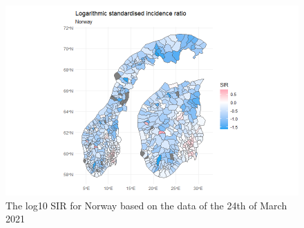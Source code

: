 \begin{figure}[H]
 \centering
 \includegraphics[width = 1.2\textwidth]{sir_norway_log.png}
 \caption{The log10 SIR for Norway based on the data of the 24th of March 2021}
 \label{sirnorwaylog}
\end{figure}
\clearpage
